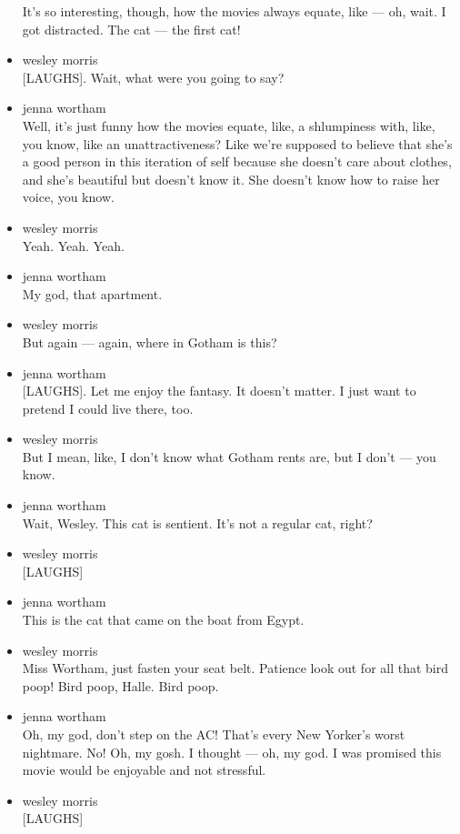 \begin{itemize}
  It's so interesting, though, how the movies always equate, like ---
  oh, wait. I got distracted. The cat --- the first cat!
\item
  wesley morris\\
  {[}LAUGHS{]}. Wait, what were you going to say?
\item
  jenna wortham\\
  Well, it's just funny how the movies equate, like, a shlumpiness with,
  like, you know, like an unattractiveness? Like we're supposed to
  believe that she's a good person in this iteration of self because she
  doesn't care about clothes, and she's beautiful but doesn't know it.
  She doesn't know how to raise her voice, you know.
\item
  wesley morris\\
  Yeah. Yeah. Yeah.
\item
  jenna wortham\\
  My god, that apartment.
\item
  wesley morris\\
  But again --- again, where in Gotham is this?
\item
  jenna wortham\\
  {[}LAUGHS{]}. Let me enjoy the fantasy. It doesn't matter. I just want
  to pretend I could live there, too.
\item
  wesley morris\\
  But I mean, like, I don't know what Gotham rents are, but I don't ---
  you know.
\item
  jenna wortham\\
  Wait, Wesley. This cat is sentient. It's not a regular cat, right?
\item
  wesley morris\\
  {[}LAUGHS{]}
\item
  jenna wortham\\
  This is the cat that came on the boat from Egypt.
\item
  wesley morris\\
  Miss Wortham, just fasten your seat belt. Patience look out for all
  that bird poop! Bird poop, Halle. Bird poop.
\item
  jenna wortham\\
  Oh, my god, don't step on the AC! That's every New Yorker's worst
  nightmare. No! Oh, my gosh. I thought --- oh, my god. I was promised
  this movie would be enjoyable and not stressful.
\item
  wesley morris\\
  {[}LAUGHS{]}

\end{itemize}
